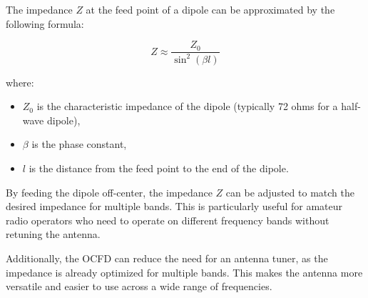 The impedance \( Z \) at the feed point of a dipole can be approximated by the following formula:

\[
Z \approx \frac{Z_0}{\sin^2(\beta l)}
\]

where:
\begin{itemize}
    \item \( Z_0 \) is the characteristic impedance of the dipole (typically 72 ohms for a half-wave dipole),
    \item \( \beta \) is the phase constant,
    \item \( l \) is the distance from the feed point to the end of the dipole.
\end{itemize}

By feeding the dipole off-center, the impedance \( Z \) can be adjusted to match the desired impedance for multiple bands. This is particularly useful for amateur radio operators who need to operate on different frequency bands without retuning the antenna.

Additionally, the OCFD can reduce the need for an antenna tuner, as the impedance is already optimized for multiple bands. This makes the antenna more versatile and easier to use across a wide range of frequencies.

